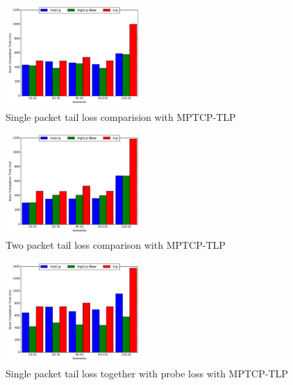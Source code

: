 \documentclass[10pt,draftcls,twocolumn]{IEEEconf}
\begin{document}
\begin{figure}[!ht]
\begin{center}
\includegraphics[angle=0, width=0.46\textwidth, natwidth=578.16,natheight=433.62]{plots/1PNew.pdf}
\caption{Single packet tail loss comparision with MPTCP-TLP}\label{1pn}
\end{center}
\end{figure}

\begin{figure}[!ht]
\begin{center}
\includegraphics[angle=0, width=0.46\textwidth, natwidth=578.16,natheight=433.62]{plots/2PNew.pdf}
\caption{Two packet tail loss comparison with MPTCP-TLP}\label{2pn}
\end{center}
\end{figure}

\begin{figure}[!ht]
\begin{center}
\includegraphics[angle=0, width=0.46\textwidth, natwidth=578.16,natheight=433.62]{plots/1PPNew.pdf}
\caption{Single packet tail loss together with probe loss with MPTCP-TLP}\label{1ppn}
\end{center}
\end{figure}






\end{document}
